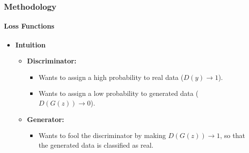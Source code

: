 \documentclass[aspectratio=169, lecture, amberg]{OTHAWbeamer}
\begin{document}
\begin{frame}[t]
    \frametitle{Methodology}
    \framesubtitle{Loss Functions}

    \begin{itemize}
        \item \textbf{Intuition}
         \vspace{0.4cm}
        \begin{itemize}
            \item \textbf{Discriminator:}
            \vspace{0.4cm}
            \begin{itemize}
                \item Wants to assign a high probability to real data (\(D(y) \rightarrow 1\)).
                \vspace{0.4cm}
                \item Wants to assign a low probability to generated data (\(D(G(z)) \rightarrow 0\)).
                \vspace{0.4cm}
            \end{itemize}
            
            \item \textbf{Generator:}
            \vspace{0.4cm}
            \begin{itemize}
                \item Wants to fool the discriminator by making \(D(G(z)) \rightarrow 1\), so that the generated data is classified as real.
            \end{itemize}
        \end{itemize}
    \end{itemize}

\end{frame}
\end{document}
